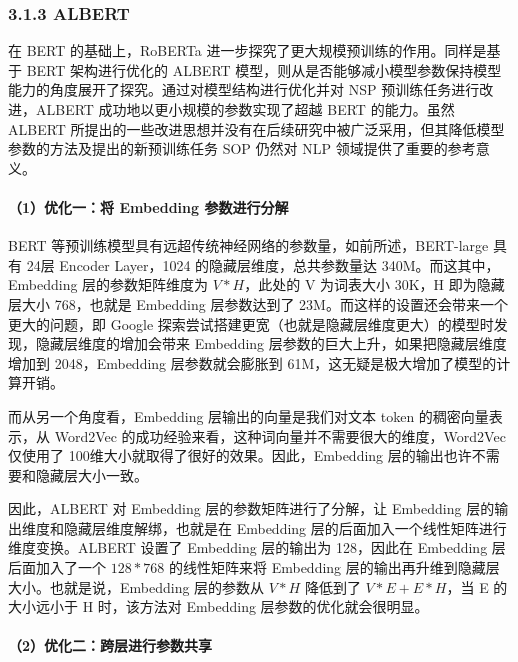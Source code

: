 \documentclass[12pt,a4paper]{book}
\begin{document}
\subsubsection{3.1.3 ALBERT}\label{albert}

在 BERT 的基础上，RoBERTa 进一步探究了更大规模预训练的作用。同样是基于
BERT 架构进行优化的 ALBERT
模型，则从是否能够减小模型参数保持模型能力的角度展开了探究。通过对模型结构进行优化并对
NSP 预训练任务进行改进，ALBERT 成功地以更小规模的参数实现了超越 BERT
的能力。虽然 ALBERT
所提出的一些改进思想并没有在后续研究中被广泛采用，但其降低模型参数的方法及提出的新预训练任务
SOP 仍然对 NLP 领域提供了重要的参考意义。

\paragraph{（1）优化一：将 Embedding
参数进行分解}\label{ux4f18ux5316ux4e00ux5c06-embedding-ux53c2ux6570ux8fdbux884cux5206ux89e3}

BERT 等预训练模型具有远超传统神经网络的参数量，如前所述，BERT-large 具有
24层 Encoder Layer，1024 的隐藏层维度，总共参数量达
340M。而这其中，Embedding 层的参数矩阵维度为 \(V*H\)，此处的 V
为词表大小 30K，H 即为隐藏层大小 768，也就是 Embedding 层参数达到了
23M。而这样的设置还会带来一个更大的问题，即 Google
探索尝试搭建更宽（也就是隐藏层维度更大）的模型时发现，隐藏层维度的增加会带来
Embedding 层参数的巨大上升，如果把隐藏层维度增加到 2048，Embedding
层参数就会膨胀到 61M，这无疑是极大增加了模型的计算开销。

而从另一个角度看，Embedding 层输出的向量是我们对文本 token
的稠密向量表示，从 Word2Vec
的成功经验来看，这种词向量并不需要很大的维度，Word2Vec 仅使用了
100维大小就取得了很好的效果。因此，Embedding
层的输出也许不需要和隐藏层大小一致。

因此，ALBERT 对 Embedding 层的参数矩阵进行了分解，让 Embedding
层的输出维度和隐藏层维度解绑，也就是在 Embedding
层的后面加入一个线性矩阵进行维度变换。ALBERT 设置了 Embedding 层的输出为
128，因此在 Embedding 层后面加入了一个 \(128*768\) 的线性矩阵来将
Embedding 层的输出再升维到隐藏层大小。也就是说，Embedding 层的参数从
\(V*H\) 降低到了 \(V*E + E*H\)，当 E 的大小远小于 H 时，该方法对
Embedding 层参数的优化就会很明显。

\paragraph{（2）优化二：跨层进行参数共享}\label{ux4f18ux5316ux4e8cux8de8ux5c42ux8fdbux884cux53c2ux6570ux5171ux4eab}
\end{document}
